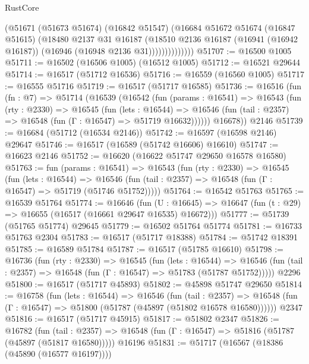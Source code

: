 \begin{lexlean}{RustCore}
\begin{coremodule}
                    (@51671
                      (@51673 @51674)
                      (@16842 @51547)
                      (@16684
                        @51672
                        @51674
                        (@16847 @51615)
                        (@18480
                          @2137
                          @31
                          @16187
                          (@18510
                            @2136
                            @16187
                            (@16941 (@16942 @16187))
                            (@16946 (@16948 @2136 @31))))))))))))))
@51707 := @16500 @1005
@51711 := @16502 (@16506 @1005) (@16512 @1005)
@51712 := @16521 @29644
@51714 := @16517 (@51712 @16536)
@51716 := @16559 (@16560 @1005)
@51717 := @16555 @51716
@51719 := @16517 (@51717 @16585)
@51736 := @16516
    (fun (fn : @7) =>
    @51714
      (@16539
        (@16542
          (fun (params : @16541) =>
          @16543
            (fun (rty : @2330) =>
            @16545
              (fun (lets : @16544) =>
              @16546 (fun (tail : @2357) => @16548 (fun (Γ : @16547) => @51719 @16632))))))
        @16678))
    @2146
@51739 := @16684 (@51712 (@16534 @2146))
@51742 := @16597 (@16598 @2146) @29647
@51746 := @16517 (@16589 (@51742 @16606) @16610)
@51747 := @16623 @2146
@51752 := @16620 (@16622 @51747 @29650 @16578 @16580)
@51763 := fun (params : @16541) =>
  @16543
    (fun (rty : @2330) =>
    @16545
      (fun (lets : @16544) =>
      @16546 (fun (tail : @2357) => @16548 (fun (Γ : @16547) => @51719 (@51746 @51752)))))
@51764 := @16542 @51763
@51765 := @16539 @51764
@51774 := @16646
    (fun (U : @16645) => @16647 (fun (t : @29) => @16655 (@16517 (@16661 @29647 @16535) @16672)))
@51777 := @51739 (@51765 @51774) @29645
@51779 := @16502 @51764 @51774
@51781 := @16733 @51763 @2304
@51783 := @16517 (@51717 @18388)
@51784 := @51742 @18391
@51785 := @16589 @51784
@51787 := @16517 (@51785 @16610)
@51798 := @16736
    (fun (rty : @2330) =>
    @16545
      (fun (lets : @16544) =>
      @16546 (fun (tail : @2357) => @16548 (fun (Γ : @16547) => @51783 (@51787 @51752)))))
    @2296
@51800 := @16517 (@51717 @45893)
@51802 := @45898 @51747 @29650
@51814 := @16758
    (fun (lets : @16544) =>
    @16546
      (fun (tail : @2357) =>
      @16548 (fun (Γ : @16547) => @51800 (@51787 (@45897 (@51802 @16578 @16580))))))
    @2347
@51816 := @16517 (@51717 @45915)
@51817 := @51802 @2347
@51826 := @16782
    (fun (tail : @2357) => @16548 (fun (Γ : @16547) => @51816 (@51787 (@45897 (@51817 @16580)))))
    @16196
@51831 := @51717 (@16567 (@18386 (@45890 (@16577 @16197))))

\end{coremodule}
\end{lexlean}
